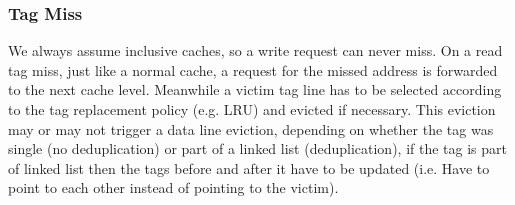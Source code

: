 \subsubsection{Tag Miss}
We always assume inclusive caches, so a write request can never miss. On a read tag miss, just like a normal cache, a request for the missed address is forwarded to the next cache level. Meanwhile a victim tag line has to be selected according to the tag replacement policy (e.g. LRU) and evicted if necessary. This eviction may or may not trigger a data line eviction, depending on whether the tag was single (no deduplication) or part of a linked list (deduplication), if the tag is part of linked list then the tags before and after it have to be updated (i.e. Have to point to each other instead of pointing to the victim).

